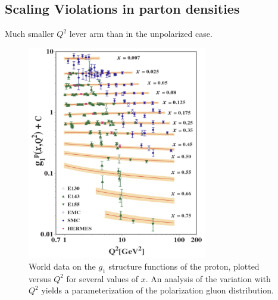 \subsection{Scaling Violations in parton densities}

Much smaller $Q^2$ lever arm than in the unpolarized case.

\begin{figure}
  \centering
  \includegraphics[width=0.7\textwidth]{figures/g1_x_q2}
  \caption{World data on the $g_1$ structure functions of the proton, plotted
  versus $Q^2$ for several values of $x$. An analysis of the variation with
  $Q^2$ yields a parameterization of the polarization gluon distribution.}
  \label{fig:g1-versus-q2}
\end{figure}


